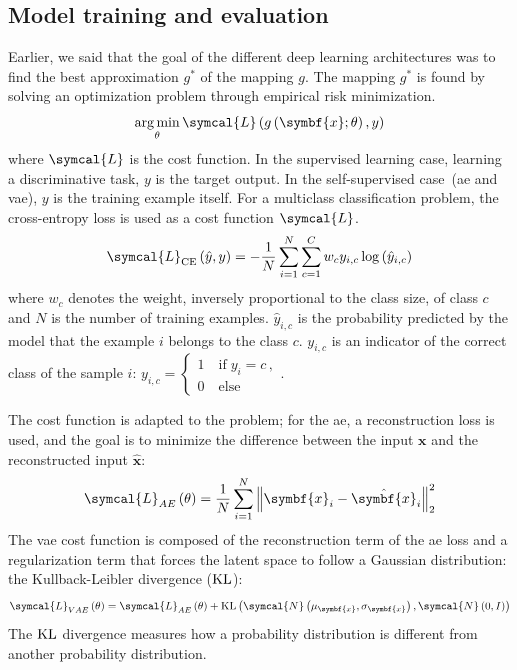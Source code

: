 \documentclass[../main.tex]{subfiles}
\begin{document}
	\subsection{Model training and evaluation}
		Earlier, we said that the goal of the different deep learning architectures was to find the best approximation \(g^{*}\) of the mapping \(g\).
		The mapping \(g^{*}\) is found by solving an optimization problem through empirical risk minimization.
		\begin{equation}
			\argmin_{\theta} \symcal{L}\left(g\left(\symbf{x}; \theta\right), y\right) \label{eq:dl_opt}
		\end{equation}
		where \(\symcal{L}\) is the cost function.
		In the supervised learning case, learning a discriminative task, \(y\) is the target output.
		In the self-supervised case~(\gls{ae} and \gls{vae}), \(y\) is the training example itself.
		For a multiclass classification problem, the cross-entropy loss is used as a cost function \(\symcal{L}\).
		\begin{equation}
			\symcal{L}_{\text{CE}}\left(\hat{y}, y\right) = -\frac{1}{N}\sum_{i=1}^{N}\sum_{c=1}^{C} w_c y_{i,c}\log\left(\hat{y}_{i,c}\right)\label{eq:ce_loss}
		\end{equation}
		where \(w_c\) denotes the weight, inversely proportional to the class size, of class \(c\) and \(N\) is the number of training examples.
		\(\hat{y}_{i,c}\) is the probability predicted by the model that the example \(i\) belongs to the class \(c\).
		\(y_{i,c}\) is an indicator of the correct class of the sample \(i\):
		\(
		y_{i,c} = \begin{cases}
			1 \quad \text{if}\; y_i = c \, , \\
			0 \quad \text{else}
		\end{cases}
		\).

		The cost function is adapted to the problem; for the \gls{ae}, a reconstruction loss is used, and the goal is to minimize the difference between the input \(\symbf{x}\) and the reconstructed input \(\hat{\symbf{x}}\):
		\begin{equation}
			\symcal{L}_{AE}\left(\theta\right) = \frac{1}{N}\sum_{i=1}^{N} {\left\|\symbf{x}_i - \hat{\symbf{x}}_i \right\|}_2^{2} \label{eq:loss_ae}
		\end{equation}
		The \gls{vae} cost function is composed of the reconstruction term of the \gls{ae} loss and a regularization term that forces the latent space to follow a Gaussian distribution: the Kullback-Leibler divergence (\(\operatorname{KL}\)):
		\begin{equation}
			\symcal{L}_{VAE}\left(\theta\right) = \symcal{L}_{AE}\left(\theta\right) + \KL\left(\symcal{N}\left(\mu_{\symbf{x}}, \sigma_{\symbf{x}}\right), \symcal{N}\left(0, I\right)\right)
		\end{equation}
		The \(\operatorname{KL}\) divergence measures how a probability distribution is different from another probability distribution.
\end{document}
